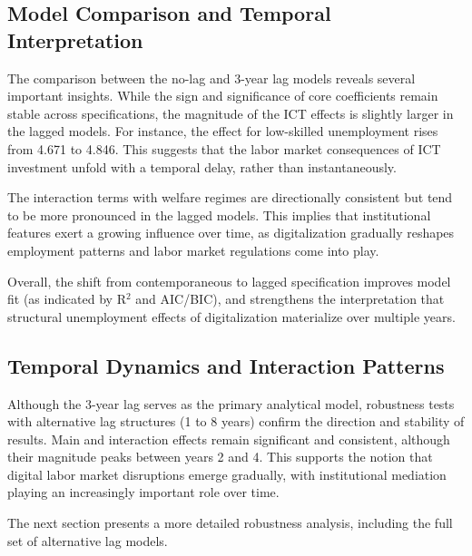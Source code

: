 \subsection{Model Comparison and Temporal Interpretation}

The comparison between the no-lag and 3-year lag models reveals several important insights. While the 
sign and significance of core coefficients remain stable across specifications, the magnitude of the 
ICT effects is slightly larger in the lagged models. For instance, the effect for low-skilled 
unemployment rises from 4.671 to 4.846. This suggests that the labor market consequences of ICT 
investment unfold with a temporal delay, rather than instantaneously.

The interaction terms with welfare regimes are directionally consistent but tend to be more 
pronounced in the lagged models. This implies that institutional features exert a growing influence 
over time, as digitalization gradually reshapes employment patterns and labor market regulations come 
into play.

Overall, the shift from contemporaneous to lagged specification improves model fit (as indicated by 
R$^2$ and AIC/BIC), and strengthens the interpretation that structural unemployment effects of 
digitalization materialize over multiple years.

\subsection{Temporal Dynamics and Interaction Patterns}

Although the 3-year lag serves as the primary analytical model, robustness tests with alternative lag 
structures (1 to 8 years) confirm the direction and stability of results. Main and interaction 
effects remain significant and consistent, although their magnitude peaks between years 2 and 4. This 
supports the notion that digital labor market disruptions emerge gradually, with institutional 
mediation playing an increasingly important role over time.

The next section presents a more detailed robustness analysis, including the full set of alternative 
lag models.
